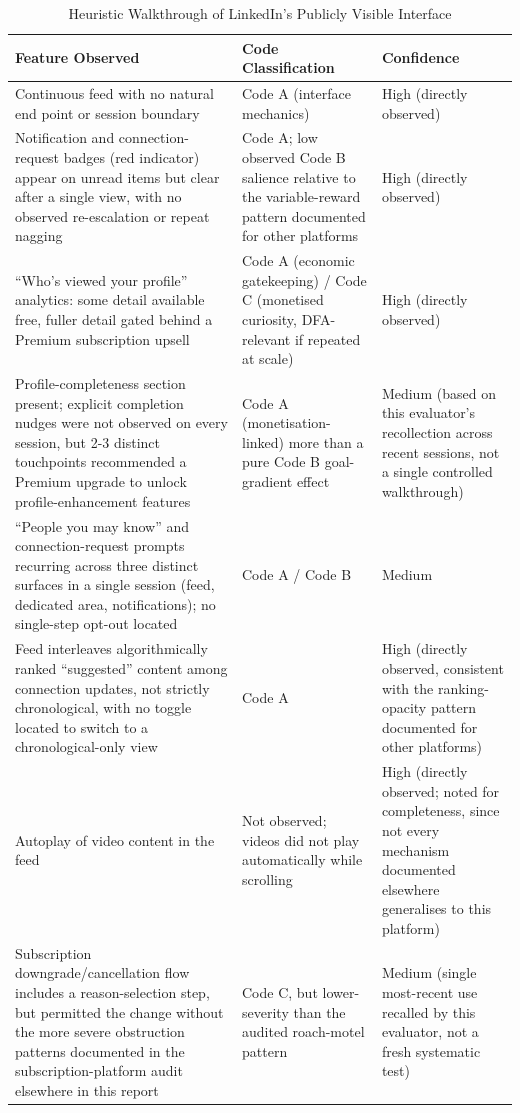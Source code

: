 \documentclass[11pt]{article}
\begin{document}
\begin{table}[H]
\centering
\caption{Heuristic Walkthrough of LinkedIn's Publicly Visible Interface}
\label{tab:linkedin_heuristic_walkthrough}
\begin{tabular}{p{4.6cm}p{4.3cm}p{4.6cm}}
\hline
Feature Observed & Code Classification & Confidence \\
\hline
Continuous feed with no natural end point or session boundary & Code A (interface mechanics) & High (directly observed) \\
Notification and connection-request badges (red indicator) appear on unread items but clear after a single view, with no observed re-escalation or repeat nagging & Code A; low observed Code B salience relative to the variable-reward pattern documented for other platforms & High (directly observed) \\
``Who's viewed your profile'' analytics: some detail available free, fuller detail gated behind a Premium subscription upsell & Code A (economic gatekeeping) / Code C (monetised curiosity, DFA-relevant if repeated at scale) & High (directly observed) \\
Profile-completeness section present; explicit completion nudges were not observed on every session, but 2-3 distinct touchpoints recommended a Premium upgrade to unlock profile-enhancement features & Code A (monetisation-linked) more than a pure Code B goal-gradient effect & Medium (based on this evaluator's recollection across recent sessions, not a single controlled walkthrough) \\
``People you may know'' and connection-request prompts recurring across three distinct surfaces in a single session (feed, dedicated area, notifications); no single-step opt-out located & Code A / Code B & Medium \\
Feed interleaves algorithmically ranked ``suggested'' content among connection updates, not strictly chronological, with no toggle located to switch to a chronological-only view & Code A & High (directly observed, consistent with the ranking-opacity pattern documented for other platforms) \\
Autoplay of video content in the feed & Not observed; videos did not play automatically while scrolling & High (directly observed; noted for completeness, since not every mechanism documented elsewhere generalises to this platform) \\
Subscription downgrade/cancellation flow includes a reason-selection step, but permitted the change without the more severe obstruction patterns documented in the subscription-platform audit elsewhere in this report & Code C, but lower-severity than the audited roach-motel pattern & Medium (single most-recent use recalled by this evaluator, not a fresh systematic test) \\
\hline
\end{tabular}
\end{table}
\end{document}
